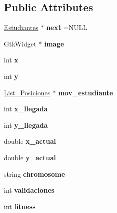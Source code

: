\subsection*{Public Attributes}
\begin{DoxyCompactItemize}
\item 
\mbox{\label{classEstudiantes_a5703886de390d389649592cba1721dab}} 
\hyperlink{classEstudiantes}{Estudiantes} $\ast$ {\bfseries next} =N\+U\+LL
\item 
\mbox{\label{classEstudiantes_a3388259132aba64f5ea59e7db53378c9}} 
Gtk\+Widget $\ast$ {\bfseries image}
\item 
\mbox{\label{classEstudiantes_a5aeb4b6146fbfaca7377468a9742f884}} 
int {\bfseries x}
\item 
\mbox{\label{classEstudiantes_af977b0160a2b907d7502d1c1e1ac1046}} 
int {\bfseries y}
\item 
\mbox{\label{classEstudiantes_aa602bdc0b147009ed647347d7c64b1dd}} 
\hyperlink{classList__Posiciones}{List\+\_\+\+Posiciones} $\ast$ {\bfseries mov\+\_\+estudiante}
\item 
\mbox{\label{classEstudiantes_a6cd44e6f768e6ecb9fc366152fa8ab01}} 
int {\bfseries x\+\_\+llegada}
\item 
\mbox{\label{classEstudiantes_a8c21b7ea00ad16658899354c07026d67}} 
int {\bfseries y\+\_\+llegada}
\item 
\mbox{\label{classEstudiantes_a1cfadc3671013a62c6f4dc6c573b9602}} 
double {\bfseries x\+\_\+actual}
\item 
\mbox{\label{classEstudiantes_ab470cab81b126566bae8bf7332e95b9c}} 
double {\bfseries y\+\_\+actual}
\item 
\mbox{\label{classEstudiantes_a5fecd41b36d2bf3ce1293bc26a48f509}} 
string {\bfseries chromosome}
\item 
\mbox{\label{classEstudiantes_a9de6a9f62493eb6cad8d790fae733012}} 
int {\bfseries validaciones}
\item 
\mbox{\label{classEstudiantes_a189067d51a2d2224b2284319cd295dbf}} 
int {\bfseries fitness}
\end{DoxyCompactItemize}


